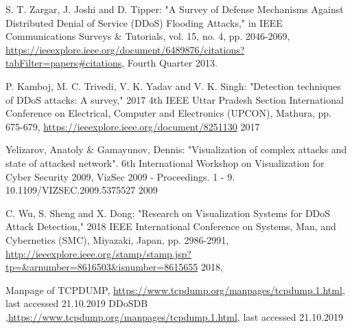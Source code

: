 \begin{thebibliography}{99}

 S. T. Zargar, J. Joshi and D. Tipper: "A Survey of Defense Mechanisms Against Distributed Denial of Service (DDoS) Flooding Attacks," in IEEE Communications Surveys \& Tutorials, vol. 15, no. 4, pp. 2046-2069, \url{https://ieeexplore.ieee.org/document/6489876/citations?tabFilter=papers#citations}, Fourth Quarter 2013.

 P. Kamboj, M. C. Trivedi, V. K. Yadav and V. K. Singh: "Detection techniques of DDoS attacks: A survey," 2017 4th IEEE Uttar Pradesh Section International Conference on Electrical, Computer and Electronics (UPCON), Mathura,  pp. 675-679, \url{https://ieeexplore.ieee.org/document/8251130} 2017

 Yelizarov, Anatoly \& Gamayunov, Dennis: "Visualization of complex attacks and state of attacked network". 6th International Workshop on Visualization for Cyber Security 2009, VizSec 2009 - Proceedings. 1 - 9. 10.1109/VIZSEC.2009.5375527 2009

 C. Wu, S. Sheng and X. Dong: "Research on Visualization Systems for DDoS Attack Detection," 2018 IEEE International Conference on Systems, Man, and Cybernetics (SMC), Miyazaki, Japan, pp. 2986-2991, \url{http://ieeexplore.ieee.org/stamp/stamp.jsp?tp=&arnumber=8616503&isnumber=8615655} 2018, 

 Manpage of TCPDUMP, \url{https://www.tcpdump.org/manpages/tcpdump.1.html}, last accessed 21.10.2019
 DDoSDB ,\url{https://www.tcpdump.org/manpages/tcpdump.1.html}, last accessed 21.10.2019
\end{thebibliography}

